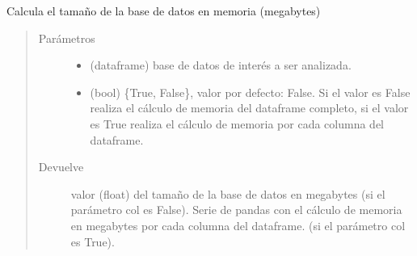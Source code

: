 \documentclass[letterpaper,10pt,openany,spanish]{sphinxmanual}
\begin{document}
\begin{fulllineitems}
\label{\detokenize{datos:datos.memoria}}
Calcula el tamaño de la base de datos en memoria (megabytes)
\begin{quote}\begin{description}
\item[{Parámetros}] \leavevmode\begin{itemize}
\item {} 
 \textendash{} (dataframe) base de datos de interés a ser analizada.

\item {} 
 \textendash{} (bool) \{True, False\}, valor por defecto: False. Si el valor es False realiza el cálculo de memoria del dataframe completo, si el valor es True realiza el cálculo de memoria por cada columna del dataframe.

\end{itemize}

\item[{Devuelve}] \leavevmode
valor (float) del tamaño de la base de datos en megabytes (si el parámetro col es False). Serie de pandas con el cálculo de memoria en megabytes por cada columna del dataframe. (si el parámetro col es True).

\end{description}\end{quote}

\end{fulllineitems}

\end{document}
